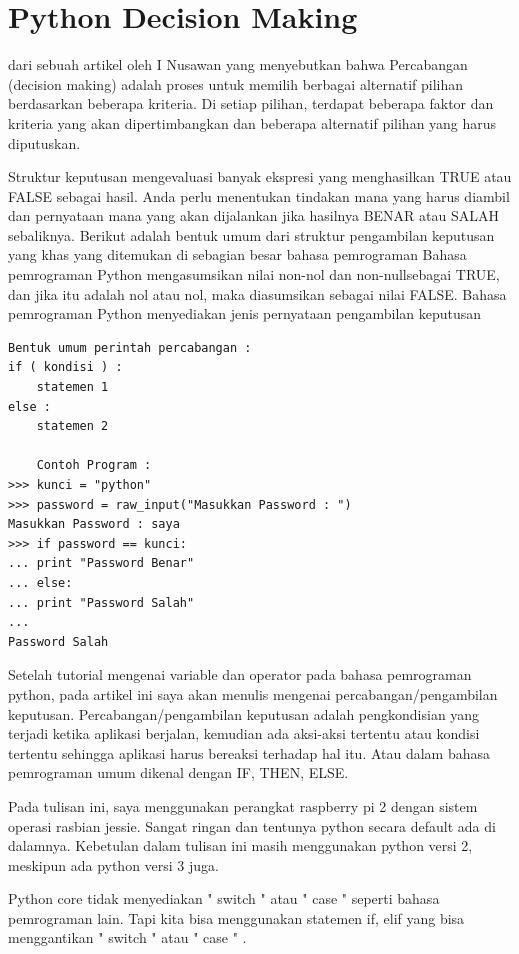 
\section {Python Decision Making} 

 
dari sebuah artikel oleh I Nusawan yang menyebutkan bahwa Percabangan (decision making) adalah proses untuk memilih berbagai alternatif pilihan 
berdasarkan beberapa kriteria. Di setiap pilihan, terdapat beberapa faktor dan kriteria yang akan dipertimbangkan dan beberapa alternatif pilihan yang
harus diputuskan. 

Struktur keputusan mengevaluasi banyak ekspresi yang menghasilkan TRUE atau FALSE sebagai hasil.   Anda perlu menentukan tindakan mana yang harus 
diambil dan pernyataan mana yang akan dijalankan jika hasilnya BENAR atau SALAH sebaliknya. Berikut adalah bentuk umum dari struktur pengambilan keputusan
yang khas yang ditemukan di sebagian besar bahasa pemrograman Bahasa pemrograman Python mengasumsikan nilai   non-nol   dan   non-nullsebagai TRUE, 
dan jika itu adalah nol atau nol, maka diasumsikan sebagai nilai FALSE. Bahasa pemrograman Python menyediakan jenis pernyataan pengambilan keputusan

\begin {verbatim}
Bentuk umum perintah percabangan :
if ( kondisi ) :
	statemen 1
else :
	statemen 2
	
	Contoh Program :
>>> kunci = "python"
>>> password = raw_input("Masukkan Password : ")
Masukkan Password : saya
>>> if password == kunci:
... print "Password Benar"
... else:
... print "Password Salah"
...
Password Salah
\end{verbatim}


Setelah tutorial mengenai  
{variable dan operator}
 pada bahasa pemrograman python, pada artikel ini saya akan menulis mengenai percabangan/pengambilan keputusan. Percabangan/pengambilan keputusan adalah pengkondisian yang terjadi ketika aplikasi berjalan, kemudian ada aksi-aksi tertentu atau kondisi tertentu sehingga aplikasi harus bereaksi terhadap hal itu. Atau dalam bahasa pemrograman umum dikenal dengan IF, THEN, ELSE. 

 
Pada tulisan ini, saya menggunakan perangkat raspberry pi 2 dengan sistem operasi rasbian jessie. Sangat ringan dan tentunya python secara default ada di dalamnya. Kebetulan dalam tulisan ini masih menggunakan python versi 2, meskipun ada python versi 3 juga. 

 
Python core tidak menyediakan   " switch  "  atau   " case  "  seperti bahasa pemrograman lain. Tapi kita bisa menggunakan statemen if, elif yang bisa menggantikan   " switch  "  atau   " case  " . 


